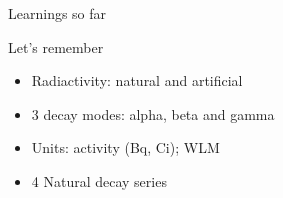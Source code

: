 \begin{frame}{Learnings so far}

\begin{alertblock}{Let's remember}

\begin{itemize}

\pause \item Radiactivity: natural and artificial

\pause \item 3 decay modes: alpha, beta and gamma

\pause \item Units: activity (Bq, Ci); WLM

\pause \item  4 Natural decay series


\end{itemize}

\end{alertblock}

\end{frame}